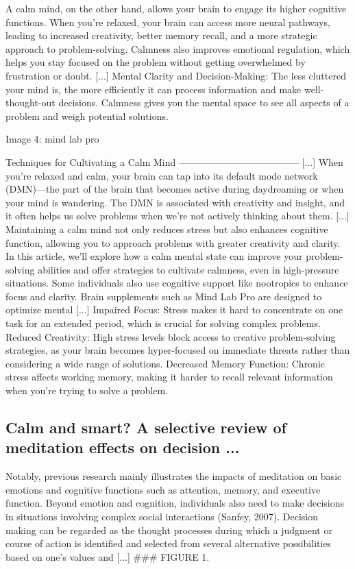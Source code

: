\documentclass[12pt]{article}
\begin{document}
A calm mind, on the other hand, allows your brain to engage its higher cognitive functions. When you’re relaxed, your brain can access more neural pathways, leading to increased creativity, better memory recall, and a more strategic approach to problem-solving. Calmness also improves emotional regulation, which helps you stay focused on the problem without getting overwhelmed by frustration or doubt. [...] Mental Clarity and Decision-Making: The less cluttered your mind is, the more efficiently it can process information and make well-thought-out decisions. Calmness gives you the mental space to see all aspects of a problem and weigh potential solutions.

Image 4: mind lab pro

Techniques for Cultivating a Calm Mind
-------------------------------------- [...] When you’re relaxed and calm, your brain can tap into its default mode network (DMN)—the part of the brain that becomes active during daydreaming or when your mind is wandering. The DMN is associated with creativity and insight, and it often helps us solve problems when we’re not actively thinking about them. [...] Maintaining a calm mind not only reduces stress but also enhances cognitive function, allowing you to approach problems with greater creativity and clarity. In this article, we’ll explore how a calm mental state can improve your problem-solving abilities and offer strategies to cultivate calmness, even in high-pressure situations. Some individuals also use cognitive support like nootropics to enhance focus and clarity. Brain supplements such as Mind Lab Pro are designed to optimize mental [...] Impaired Focus: Stress makes it hard to concentrate on one task for an extended period, which is crucial for solving complex problems.
   Reduced Creativity: High stress levels block access to creative problem-solving strategies, as your brain becomes hyper-focused on immediate threats rather than considering a wide range of solutions.
   Decreased Memory Function: Chronic stress affects working memory, making it harder to recall relevant information when you’re trying to solve a problem.\subsection{Calm and smart? A selective review of meditation effects on decision ...}
Notably, previous research mainly illustrates the impacts of meditation on basic emotions and cognitive functions such as attention, memory, and executive function. Beyond emotion and cognition, individuals also need to make decisions in situations involving complex social interactions (Sanfey, 2007). Decision making can be regarded as the thought processes during which a judgment or course of action is identified and selected from several alternative possibilities based on one’s values and [...] \#\#\# FIGURE 1.
\end{document}
